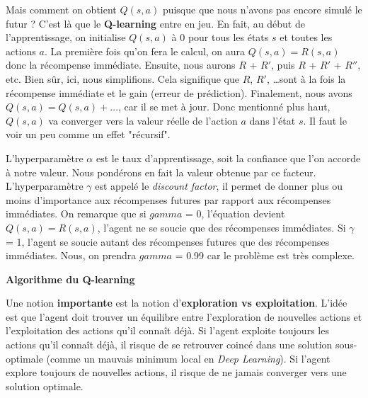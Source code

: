 \documentclass{article}
\begin{document}
\vspace{0.5cm}

Mais comment on obtient $Q(s, a)$ puisque que nous n'avons pas encore simulé le futur ? C'est là que le \textbf{Q-learning} entre en jeu.
En fait, au début de l'apprentissage, on initialise $Q(s, a)$ à 0 pour tous les états $s$ et toutes les actions $a$.
La première fois qu'on fera le calcul, on aura $Q(s, a) = R(s, a)$ donc la récompense immédiate.
Ensuite, nous aurons $R$ + $R'$, puis $R$ + $R'$ + $R''$, etc. Bien sûr, ici, nous simplifions. Cela signifique
que $R$, $R'$, \dots sont à la fois la récompense immédiate et le gain (erreur de prédiction).
Finalement, nous avons $Q(s, a) = Q(s, a) + \dots$, car il se met à jour.
Donc mentionné plus haut, $Q(s, a)$ va converger vers la valeur réelle de l'action $a$ dans l'état $s$.
Il faut le voir un peu comme un effet "récursif".

\vspace{0.5cm}

L'hyperparamètre $\alpha$ est le taux d'apprentissage, soit la confiance que l'on accorde à notre valeur.
Nous pondérons en fait la valeur obtenue par ce facteur.
L'hyperparamètre $\gamma$ est appelé le \textit{discount factor}, il permet de donner plus ou moins d'importance aux récompenses futures par rapport aux récompenses immédiates.
On remarque que si $gamma$ = 0, l'équation devient $Q(s, a) = R(s, a)$, l'agent ne se soucie que des récompenses immédiates.
Si $\gamma$ = 1, l'agent se soucie autant des récompenses futures que des récompenses immédiates.
Nous, on prendra $gamma$ = 0.99 car le problème est très complexe.

\vspace{0.5cm}

\textbf{Algorithme du Q-learning}

\vspace{0.5cm}

Une notion \textbf{importante} est la notion d'\textbf{exploration vs exploitation}.
L'idée est que l'agent doit trouver un équilibre entre l'exploration de nouvelles actions et l'exploitation des actions qu'il connaît déjà.
Si l'agent exploite toujours les actions qu'il connaît déjà, il risque de se retrouver coincé dans une solution sous-optimale (comme un mauvais minimum local en \textit{Deep Learning}).
Si l'agent explore toujours de nouvelles actions, il risque de ne jamais converger vers une solution optimale.
\end{document}

